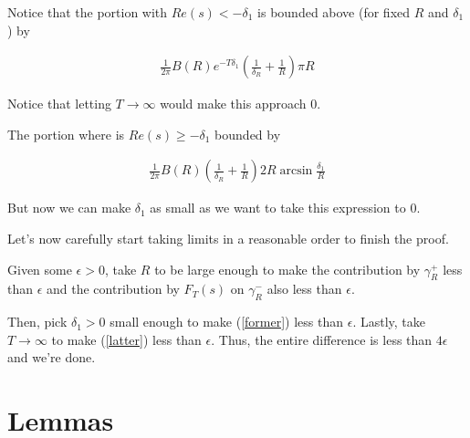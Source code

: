\documentclass{article}
\theoremstyle{definition}
\begin{document}
Notice that the portion with $ Re(s) < - \delta_{1} $ is bounded above (for fixed $ R $ and $ \delta_{1} $) by

\begin{align}\label{latter}
    \frac{1}{2\pi} B(R) e^{-T \delta_{1}} (\frac{1}{\delta_{R}} + \frac{1}{R}) \pi R
\end{align}

Notice that letting $ T \to \infty $ would make this approach $ 0 $.

The portion where is $ Re(s) \geq - \delta_{1} $ bounded by

\begin{align}\label{former}
    \frac{1}{2\pi} B(R) (\frac{1}{\delta_{R}} + \frac{1}{R}) 2 R \arcsin \frac{\delta_{1}}{R}
\end{align}

But now we can make $ \delta_{1} $ as small as we want to take this expression to $ 0 $.

Let's now carefully start taking limits in a reasonable order to finish the proof.

Given some $ \epsilon > 0 $, take $ R $ to be large enough to make the
contribution by $ \gamma_{R}^{+} $ less than $ \epsilon $ and the contribution
by $ F_{T}(s) $ on $ \gamma_{R}^{-} $ also less than $ \epsilon $.

Then, pick $ \delta_{1} > 0 $ small enough to make (\ref{former}) less than $ \epsilon $.
Lastly, take $ T \to \infty $ to make (\ref{latter}) less than $ \epsilon $.
Thus, the entire difference is less than $ 4 \epsilon $ and we're done.


\section{Lemmas}
\end{document}
